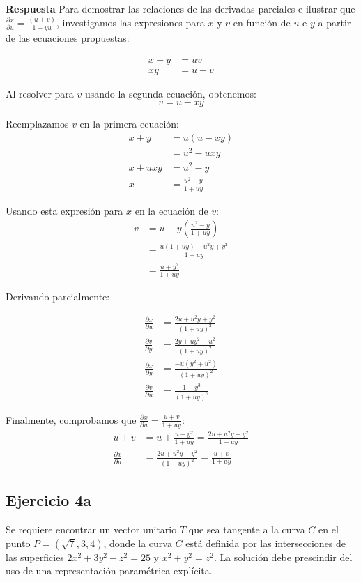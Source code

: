 \documentclass{report}
\begin{document}
\textbf{Respuesta}
Para demostrar las relaciones de las derivadas parciales e ilustrar que $\frac{\partial x}{\partial u}=\frac{(u+v)}{1+y u}$, investigamos las expresiones para $x$ y $v$ en función de $u$ e $y$ a partir de las ecuaciones propuestas:

\begin{align*}
x + y &= uv \\
xy &= u - v
\end{align*}

Al resolver para $v$ usando la segunda ecuación, obtenemos:
\[ v = u - xy \]

Reemplazamos $v$ en la primera ecuación:
\begin{align*}
x + y &= u(u - xy) \\
&= u^2 - uxy \\
x + uxy &= u^2 - y \\
x &= \frac{u^2 - y}{1 + uy}
\end{align*}

Usando esta expresión para $x$ en la ecuación de $v$:
\begin{align*}
v &= u - y\left(\frac{u^2 - y}{1 + uy}\right) \\
&= \frac{u(1 + uy) - u^2y + y^2}{1 + uy} \\
&= \frac{u + y^2}{1 + uy}
\end{align*}

Derivando parcialmente:

\begin{align*}
\frac{\partial x}{\partial u} &= \frac{2u + u^2y + y^2}{(1 + uy)^2} \\
\frac{\partial v}{\partial y} &= \frac{2y + uy^2 - u^2}{(1 + uy)^2} \\
\frac{\partial x}{\partial y} &= \frac{-u(y^2 + u^2)}{(1 + uy)^2} \\
\frac{\partial v}{\partial u} &= \frac{1 - y^3}{(1 + uy)^2}
\end{align*}

Finalmente, comprobamos que $\frac{\partial x}{\partial u}=\frac{u + v}{1 + uy}$:
\begin{align*}
u + v &= u + \frac{u + y^2}{1 + uy} = \frac{2u + u^2y + y^2}{1 + uy} \\
\frac{\partial x}{\partial u} &= \frac{2u + u^2y + y^2}{(1 + uy)^2} = \frac{u + v}{1 + uy}
\end{align*}\subsection{Ejercicio 4a}
Se requiere encontrar un vector unitario $T$ que sea tangente a la curva $C$ en el punto $P=(\sqrt{7}, 3,4)$, donde la curva $C$ está definida por las intersecciones de las superficies $2 x^{2}+3 y^{2}-z^{2}=25$ y $x^{2}+y^{2}=z^{2}$. La solución debe prescindir del uso de una representación paramétrica explícita.
\end{document}
